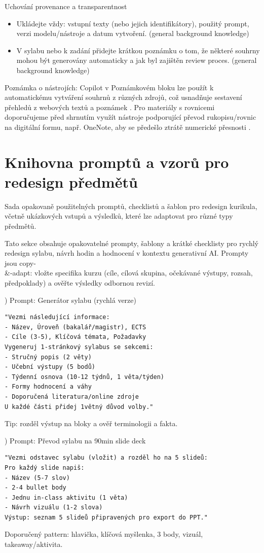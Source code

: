 \documentclass{report}%
\begin{document}
Uchování provenance a transparentnost
\begin{itemize}
  \item Ukládejte vždy: vstupní texty (nebo jejich identifikátory), použitý prompt, verzi modelu/nástroje a datum vytvoření. (general background knowledge)
  \item V sylabu nebo k zadání přidejte krátkou poznámku o tom, že některé souhrny mohou být generovány automaticky a jak byl zajištěn review proces. (general background knowledge)
\end{itemize}

Poznámka o nástrojích: Copilot v Poznámkovém bloku lze použít k automatickému vytváření souhrnů z různých zdrojů, což usnadňuje sestavení přehledů z webových textů a poznámek \cite{kb_ai_101_tipu_pdf_04e4a115_page_14_1}. Pro materiály s rovnicemi doporučujeme před shrnutím využít nástroje podporující převod rukopisu/rovnic na digitální formu, např. OneNote, aby se předešlo ztrátě numerické přesnosti \cite{kb_ai_101_tipu_pdf_04e4a115_page_8_1}.%

%
\section{Knihovna promptů a vzorů pro redesign předmětů}%
Sada opakovaně použitelných promptů, checklistů a šablon pro redesign kurikula, včetně ukázkových vstupů a výsledků, které lze adaptovat pro různé typy předmětů.%


%
Tato sekce obsahuje opakovatelné prompty, šablony a krátké checklisty pro rychlý redesign sylabu, návrh hodin a hodnocení v kontextu generativní AI. Prompty jsou copy-\\ \&-adapt: vložte specifika kurzu (cíle, cílová skupina, očekávané výstupy, rozsah, předpoklady) a ověřte výsledky odbornou revizí.

\medskip
{}) Prompt: Generátor sylabu (rychlá verze)
\begin{verbatim}
"Vezmi následující informace:
- Název, Úroveň (bakalář/magistr), ECTS
- Cíle (3-5), Klíčová témata, Požadavky
Vygeneruj 1-stránkový sylabus se sekcemi:
- Stručný popis (2 věty)
- Učební výstupy (5 bodů)
- Týdenní osnova (10-12 týdnů, 1 věta/týden)
- Formy hodnocení a váhy
- Doporučená literatura/online zdroje
U každé části přidej 1větný důvod volby."
\end{verbatim}
Tip: rozděl výstup na bloky a ověř terminologii a fakta.

\medskip
{}) Prompt: Převod sylabu na 90min slide deck
\begin{verbatim}
"Vezmi odstavec sylabu (vložit) a rozděl ho na 5 slideů:
Pro každý slide napiš:
- Název (5-7 slov)
- 2-4 bullet body
- Jednu in-class aktivitu (1 věta)
- Návrh vizuálu (1-2 slova)
Výstup: seznam 5 slideů připravených pro export do PPT."
\end{verbatim}
Doporučený pattern: hlavička, klíčová myšlenka, 3 body, vizuál, takeaway/aktivita.
\end{document}
